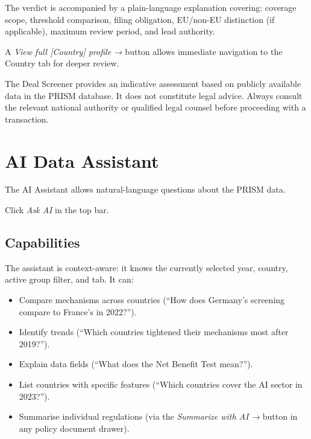 \documentclass[12pt,a4paper]{article}
\newcommand{\uielem}[1]{\textit{#1}}
\begin{document}
The verdict is accompanied by a plain-language explanation covering: coverage scope, threshold comparison, filing obligation, EU/non-EU distinction (if applicable), maximum review period, and lead authority.

A \uielem{View full [Country] profile →} button allows immediate navigation to the Country tab for deeper review.

\begin{warnbox}
The Deal Screener provides an indicative assessment based on publicly available data in the PRISM database. It does not constitute legal advice. Always consult the relevant national authority or qualified legal counsel before proceeding with a transaction.
\end{warnbox}

\section{AI Data Assistant}
\label{sec:ai}

The AI Assistant allows natural-language questions about the PRISM data.

\begin{tipbox}
Click \uielem{Ask AI} in the top bar.
\end{tipbox}

\subsection{Capabilities}

The assistant is context-aware: it knows the currently selected year, country, active group filter, and tab. It can:

\begin{itemize}
  \item Compare mechanisms across countries (``How does Germany's screening compare to France's in 2022?'').
  \item Identify trends (``Which countries tightened their mechanisms most after 2019?'').
  \item Explain data fields (``What does the Net Benefit Test mean?'').
  \item List countries with specific features (``Which countries cover the AI sector in 2023?'').
  \item Summarise individual regulations (via the \uielem{Summarize with AI →} button in any policy document drawer).
\end{itemize}
\end{document}
